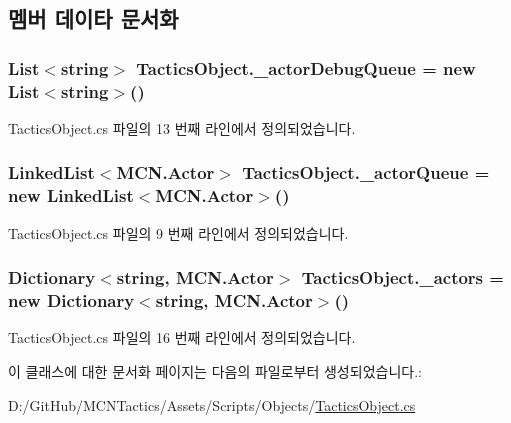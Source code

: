 \subsection{멤버 데이타 문서화}
\subsubsection[{\texorpdfstring{\+\_\+actor\+Debug\+Queue}{_actorDebugQueue}}]{\setlength{\rightskip}{0pt plus 5cm}List$<$string$>$ Tactics\+Object.\+\_\+actor\+Debug\+Queue = new List$<$string$>$()\hspace{0.3cm}{\ttfamily [private]}}\hypertarget{class_tactics_object_ac26a5e81a142ce350e9a481d59bd0daa}{}\label{class_tactics_object_ac26a5e81a142ce350e9a481d59bd0daa}


Tactics\+Object.\+cs 파일의 13 번째 라인에서 정의되었습니다.

\subsubsection[{\texorpdfstring{\+\_\+actor\+Queue}{_actorQueue}}]{\setlength{\rightskip}{0pt plus 5cm}Linked\+List$<${\bf M\+C\+N.\+Actor}$>$ Tactics\+Object.\+\_\+actor\+Queue = new Linked\+List$<${\bf M\+C\+N.\+Actor}$>$()\hspace{0.3cm}{\ttfamily [private]}}\hypertarget{class_tactics_object_a816dd74a6daa037c17a43fb28c12ca09}{}\label{class_tactics_object_a816dd74a6daa037c17a43fb28c12ca09}


Tactics\+Object.\+cs 파일의 9 번째 라인에서 정의되었습니다.

\subsubsection[{\texorpdfstring{\+\_\+actors}{_actors}}]{\setlength{\rightskip}{0pt plus 5cm}Dictionary$<$string, {\bf M\+C\+N.\+Actor}$>$ Tactics\+Object.\+\_\+actors = new Dictionary$<$string, {\bf M\+C\+N.\+Actor}$>$()\hspace{0.3cm}{\ttfamily [private]}}\hypertarget{class_tactics_object_ab16a5fde2c93cad13e6b74453664c2a9}{}\label{class_tactics_object_ab16a5fde2c93cad13e6b74453664c2a9}


Tactics\+Object.\+cs 파일의 16 번째 라인에서 정의되었습니다.



이 클래스에 대한 문서화 페이지는 다음의 파일로부터 생성되었습니다.\+:\begin{DoxyCompactItemize}
\item 
D\+:/\+Git\+Hub/\+M\+C\+N\+Tactics/\+Assets/\+Scripts/\+Objects/\hyperlink{_tactics_object_8cs}{Tactics\+Object.\+cs}\end{DoxyCompactItemize}
